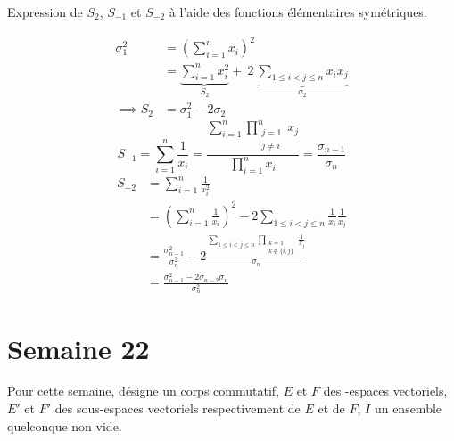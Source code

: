 \documentclass{article}
\renewenvironment{question_kholle}[2][ ]
{
	\subsection{\texorpdfstring{#2}{}}
	\notblank{#1}
	{
		\noindent #1
		\bigbreak
	}
	{}
	\begin{proof}
}
{
	\end{proof}
}
\begin{document}
	\begin{question_kholle}
		[Les sommes de Newton $(S_k)_{k\in\Z^*}$ pour une famille $(x_k)_{k \in \N^*}$ sont définies par (sous réserve d'existence pour $k<0$) :
		\begin{equation}
			S_k = \sum_{i=1}^{n} x_i^k
		\end{equation}]
		{Expression de $S_2$, $S_{-1}$ et $S_{-2}$ à l'aide des fonctions élémentaires symétriques.}

		\begin{equation*}
			\begin{aligned}
				\sigma_1^2 &= \left( \sum_{i=1}^{n} x_i \right)^2 \\
				&= \underbrace{ \sum_{i=1}^{n} x_i^2 }_{S_2} + \ 2 \ \underbrace{ \sum_{1 \leqslant i < j \leqslant n} x_i x_j }_{\sigma_2} \\
				\implies S_2 &= \sigma_1^2 - 2 \sigma_2
			\end{aligned}
		\end{equation*}
		\begin{equation*}
			S_{-1} = \sum_{i=1}^{n} \frac{1}{x_i}
			= \frac{\displaystyle \sum_{i=1}^{n} \prod_{\substack{ j = 1 \\ j \neq i }}^{n} x_j }{\displaystyle \prod_{i=1}^{n} x_i }
			= \frac{\sigma_{n-1}}{\sigma_n}
		\end{equation*}
		\begin{equation*}
			\begin{aligned}
				S_{-2} &= \sum_{i=1}^{n} \frac{1}{x_i^2} \\
				&= \left( \sum_{i=1}^{n} \frac{1}{x_i} \right)^2 - 2 \sum_{1 \leqslant i < j \leqslant n} \frac{1}{x_i} \frac{1}{x_j} \\
				&= \frac{\sigma_{n-1}^2}{\sigma_n^2} - 2 \frac{\displaystyle \sum_{1 \leqslant i < j \leqslant n} \prod_{\substack{ k = 1 \\ k \notin \{i,j\} }} \frac{1}{x_j} }{\sigma_n} \\
				&= \frac{\sigma_{n-1}^2 - 2 \sigma_{n-2}\sigma_n}{\sigma_n^2}
			\end{aligned}
		\end{equation*}
	\end{question_kholle}
\pagebreak\section{Semaine 22}

	Pour cette semaine, \K désigne un corps commutatif, $E$ et $F$ des \K\!\!-espaces vectoriels, $E'$ et $F'$ des sous-espaces vectoriels respectivement de $E$ et de $F$, $I$ un ensemble quelconque non vide.
\end{document}
